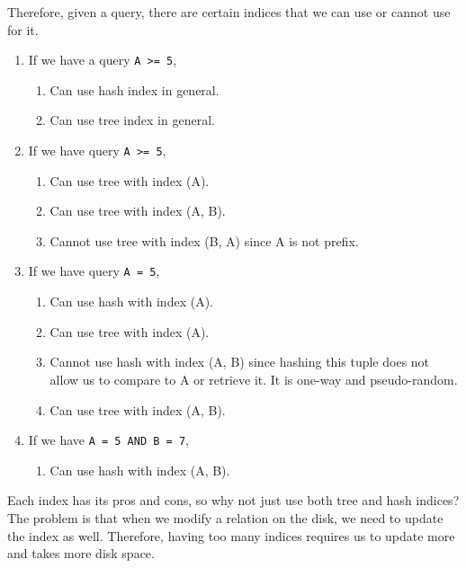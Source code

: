   \begin{example}
    Therefore, given a query, there are certain indices that we can use or cannot use for it.
    \begin{enumerate}
      \item If we have a query \texttt{A >= 5}, 
        \begin{enumerate}
          \item Can use hash index in general.  
          \item Can use tree index in general. 
        \end{enumerate}

      \item If we have query \texttt{A >= 5}, 
        \begin{enumerate}
          \item Can use tree with index (A). 
          \item Can use tree with index (A, B). 
          \item Cannot use tree with index (B, A) since A is not prefix. 
        \end{enumerate}

      \item If we have query \texttt{A = 5},
        \begin{enumerate}
          \item Can use hash with index (A). 
          \item Can use tree with index (A). 
          \item Cannot use hash with index (A, B) since hashing this tuple does not allow us to compare to A or retrieve it. It is one-way and pseudo-random.   
          \item Can use tree with index (A, B). 
        \end{enumerate}

      \item If we have \texttt{A = 5 AND B = 7}, 
        \begin{enumerate}
          \item Can use hash with index (A, B). 
        \end{enumerate}
    \end{enumerate}
  \end{example}

  Each index has its pros and cons, so why not just use both tree and hash indices? The problem is that when we modify a relation on the disk, we need to update the index as well. Therefore, having too many indices requires us to update more and takes more disk space. 

